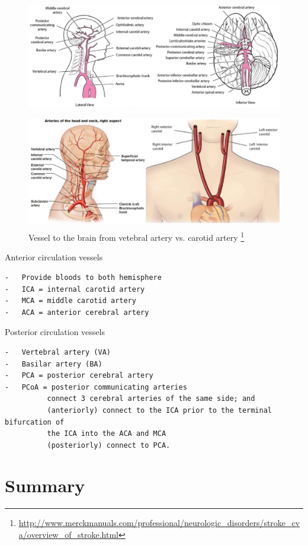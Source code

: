  \begin{figure}[hbt]
  \centerline{\includegraphics[height=5cm,
    angle=0]{./images/brain_vessel.eps}}
  \centerline{\includegraphics[height=5cm,
    angle=0]{./images/carotid_artery.eps}}
\caption{Vessel to the brain from vetebral artery vs. carotid artery
\footnote{\url{http://www.merckmanuals.com/professional/neurologic_disorders/stroke_cva/overview_of_stroke.html}}}
\label{fig:carotid_artery}
\end{figure}

Anterior circulation vessels
\begin{verbatim}
-	Provide bloods to both hemisphere
-	ICA = internal carotid artery
-	MCA = middle carotid artery
-	ACA = anterior cerebral artery
\end{verbatim}

Posterior circulation vessels
\begin{verbatim}
-	Vertebral artery (VA)
-	Basilar artery (BA)
-	PCA = posterior cerebral artery
-	PCoA = posterior communicating arteries
          connect 3 cerebral arteries of the same side; and
          (anteriorly) connect to the ICA prior to the terminal bifurcation of
          the ICA into the ACA and MCA
          (posteriorly) connect to PCA.
\end{verbatim}

\section{Summary}
\label{sec:summary-2}

